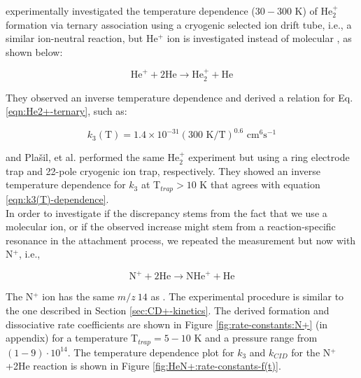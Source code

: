 \citet{bohringer_temperature_1983} experimentally investigated the temperature dependence ($30-300$ K) of He$_2^+$ formation via ternary association using a cryogenic selected ion drift tube, i.e., a similar ion-neutral reaction, but He$^+$ ion is investigated instead of molecular \CD, as shown below:

\begin{equation}
    \text{He}^+ + 2\text{He} \rightarrow \text{He}_2^+ + \text{He}
    \label{eqn:He2+-ternary}
\end{equation}

They observed an inverse temperature dependence and derived a relation for Eq.
\ref{eqn:He2+-ternary}, such as:

\begin{equation}
    k_3 (\text{T}) = 1.4 \times 10^{-31} (300 \text{ K} / \text{T})^{0.6} \text{ cm}^6\text{s}^{-1}
    \label{eqn:k3(T)-dependence}
\end{equation}

\citet{gerlich_experimental_1993} and Pla\v{s}il, et al. \cite{plasil_stabilization_2012} performed the same He$_2^+$ experiment but using a ring electrode trap and 22-pole cryogenic ion trap, respectively. They showed an inverse temperature dependence for $k_3$ at T$_{trap}>10$ K that agrees with equation \ref{eqn:k3(T)-dependence}.\\

In order to investigate if the discrepancy stems from the fact that we use a
molecular ion, or if the observed increase might stem from a reaction-specific
resonance in the attachment process, we repeated the measurement but now with
N$^+$, i.e.,

\[ \text{N}^+ + 2\text{He} \rightarrow \text{NHe}^+ + \text{He}\]

The N$^+$ ion has the same $m/z\ 14$ as \CD. The experimental procedure is
similar to the one described in Section \ref{sec:CD+-kinetics}. The derived
formation and dissociative rate coefficients are shown in Figure
\ref{fig:rate-constants:N+} (in appendix) for a temperature T$_{trap}=5-10$ K
and a pressure range from $(1 - 9 ) \cdot 10^{14}$\percc. The temperature
dependence plot for $k_3$ and $k_{CID}$ for the N$^+$+2He reaction is shown in
Figure \ref{fig:HeN+:rate-constants-f(t)}.

